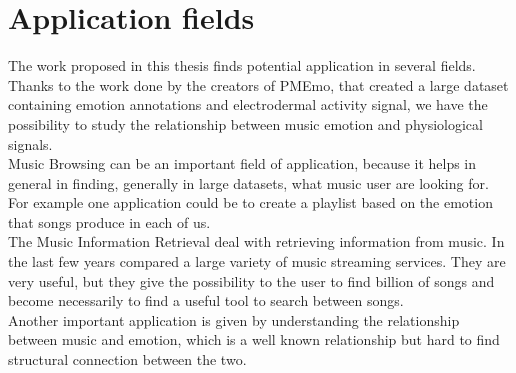 \section{Application fields}
\indent
The work proposed in this thesis finds potential application in several fields. Thanks to the work done by the creators of PMEmo, that created a large dataset containing emotion annotations and electrodermal activity signal, we have the possibility to study the relationship between music emotion and physiological signals.
\\
Music Browsing can be an important field of application, because it helps in general in finding, generally in large datasets, what music user are looking for. For example one application could be to create a playlist based on the emotion that songs produce in each of us.
\\ \indent
The Music Information Retrieval deal with retrieving information from music. In the last few years compared a large variety of music streaming services. They are very useful, but they give the possibility to the user to find billion of songs and become necessarily to find a useful tool to search between songs. 
\\ \indent
Another important application is given by understanding the relationship between music and emotion, which is a well known relationship but hard to find structural connection between the two.